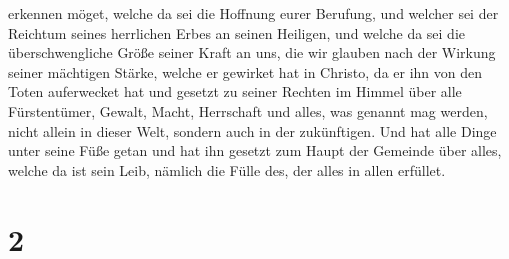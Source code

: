 erkennen möget, welche da sei die Hoffnung eurer Berufung, und welcher
sei der Reichtum seines herrlichen Erbes an seinen Heiligen,
 und welche da sei die überschwengliche Größe seiner Kraft
an uns, die wir glauben nach der Wirkung seiner mächtigen Stärke,
 welche er gewirket hat in Christo, da er ihn von den Toten
auferwecket hat und gesetzt zu seiner Rechten im Himmel 
über alle Fürstentümer, Gewalt, Macht, Herrschaft und alles, was genannt
mag werden, nicht allein in dieser Welt, sondern auch in der
zukünftigen.  Und hat alle Dinge unter seine Füße getan und
hat ihn gesetzt zum Haupt der Gemeinde über alles,  welche
da ist sein Leib, nämlich die Fülle des, der alles in allen erfüllet.

\hypertarget{section-1}{%
\section{2}\label{section-1}}

